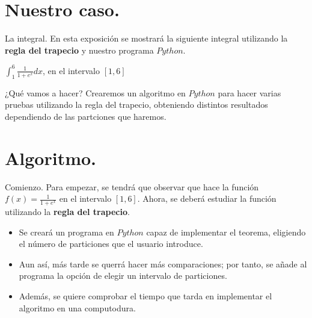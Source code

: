 \documentclass{beamer}
\begin{document}
  \section{Nuestro caso.}
  \begin{frame}
    \begin{block}{La integral.}
      En esta exposición se mostrará la siguiente integral utilizando la \textbf{regla del trapecio} y nuestro programa $Python$.\\
      \begin{center}
	$\int_{1}^{6}\frac{1}{1+e^x}dx$, en el intervalo $[1,6]$
      \end{center}
    \end{block}

    \begin{block}{¿Qué vamos a hacer?}
      Crearemos un algoritmo en \textbf{$Python$} para hacer varias pruebas utilizando la regla del trapecio, obteniendo distintos resultados dependiendo de las partciones que haremos.
    \end{block}
  \end{frame}
  \section{Algoritmo.}
  \begin{frame}
    \begin{block}{Comienzo.}
      Para empezar, se tendrá que observar que hace la función $f(x)=\frac{1}{1+e^{x}}$ en el intervalo $[1, 6]$.
      Ahora, se deberá estudiar la función utilizando la \textbf{regla del trapecio}.
    \end{block}
  \end{frame}
  \begin{frame}
    \begin{block}{ }
      \begin{itemize}
	\item Se creará un programa en $Python$ capaz de implementar el teorema, eligiendo el número de particiones que el usuario introduce.
	\pause
	\item Aun así, más tarde se querrá hacer más comparaciones; por tanto, se añade al programa la opción de elegir un intervalo de particiones.
	\pause
	\item Además, se quiere comprobar el tiempo que tarda en implementar el algoritmo en una computodura.
      \end{itemize}
    \end{block}
  \end{frame}
\end{document}
